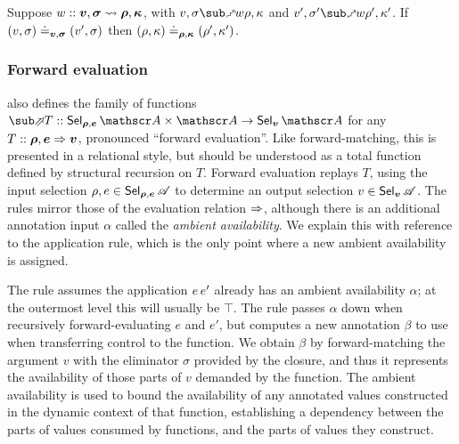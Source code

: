 \begin{lemma}
   Suppose $w :: \bm{v}, \bm{\sigma} \rightsquigarrow \bm{\rho}, \bm{\kappa}$, with $v, \sigma \matchFwdR{w} \rho, \kappa$ and $v', \sigma' \matchFwdR{w} \rho', \kappa'$. If $(v, \sigma) \doteq_{\bm{v},\bm{\sigma}} (v', \sigma)$ then $(\rho, \kappa) \doteq_{\bm{\rho}, \bm{\kappa}} (\rho', \kappa')$.
\end{lemma}

\subsubsection{Forward evaluation}

 also defines the family of functions $\evalFwdF{T} :: \Prod{\Sel{\raw{\rho}, \raw{e}}{A}}{\Ann{A}} \to \Sel{\raw{v}}{A}$ for any $T :: \bm{\rho}, \bm{e} \Rightarrow \bm{v}$, pronounced ``forward evaluation''. Like forward-matching, this is presented in a relational style, but should be understood as a total function defined by structural recursion on $T$. Forward evaluation replays $T$, using the input selection $\rho, e \in \textup{\textsf{Sel}}_{\bm{\rho}, \bm{e}}\,{\mathscr{A}}$ to determine an output selection $v \in \textup{\textsf{Sel}}_{\bm{v}}\,{\mathscr{A}}$. The rules mirror those of the evaluation relation $\Rightarrow$, although there is an additional annotation input $\alpha$ called the \emph{ambient availability}. We explain this with reference to the application rule, which is the only point where a new ambient availability is assigned.

The rule assumes the application ${e}\,{e'}$ already has an ambient availability $\alpha$; at the outermost level this will usually be $\top$. The rule passes $\alpha$ down when recursively forward-evaluating $e$ and $e'$, but computes a new annotation $\beta$ to use when transferring control to the function. We obtain $\beta$ by forward-matching the argument $v$ with the eliminator $\sigma$ provided by the closure, and thus it represents the availability of those parts of $v$ demanded by the function. The ambient availability is used to bound the availability of any annotated values constructed in the dynamic context of that function, establishing a dependency between the parts of values consumed by functions, and the parts of values they construct.

